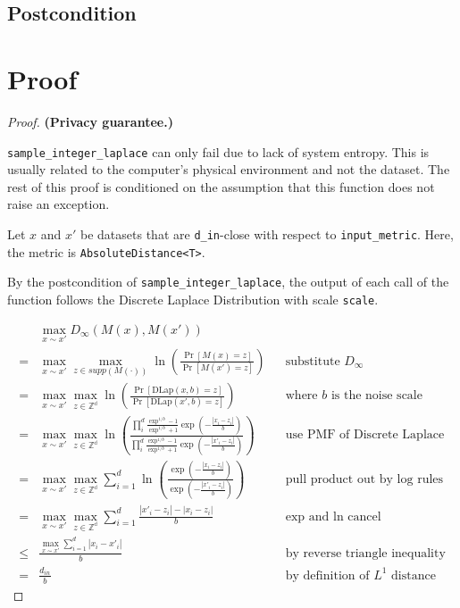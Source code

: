 \documentclass{article}
\begin{document}
\subsection*{Postcondition}


\section{Proof}

\begin{proof} 
\textbf{(Privacy guarantee.)} 

\texttt{sample\_integer\_laplace} can only fail due to lack of system entropy. 
This is usually related to the computer's physical environment and not the dataset. 
The rest of this proof is conditioned on the assumption that this function does not raise an exception. 

Let $x$ and $x'$ be datasets that are \texttt{d\_in}-close with respect to \texttt{input\_metric}.
Here, the metric is \texttt{AbsoluteDistance<T>}.

By the postcondition of \texttt{sample\_integer\_laplace},
the output of each call of the function follows the Discrete Laplace Distribution with scale \texttt{scale}.

\begin{align*}
    & \max_{x \sim x'} D_{\infty}(M(x), M(x'))  \\
    =& \max_{x \sim x'} \max_{z \in supp(M(\cdot))} \ln\left(\frac{\Pr\left[M(x) = z\right]}{\Pr\left[M(x') = z \right]}\right)
        &&\text{substitute } D_{\infty}\\
    =& \max_{x \sim x'} \max_{z \in \mathbb{Z^d}} \ln\left(\frac{\Pr\left[\mathrm{DLap}(x, b) = z \right]}{\Pr\left[\mathrm{DLap}(x', b) = z\right]}\right)
        &&\text{where } b \text{ is the noise scale} \\
    =& \max_{x \sim x'} \max_{z \in \mathbb{Z^d}} \ln\left(\frac{
        \prod_i^d \frac{\exp^{1/b} - 1}{\exp^{1/b} + 1} \exp \left( -\frac{|x_i - z_i|}{b} \right)
    }{
        \prod_i^d \frac{\exp^{1/b} - 1}{\exp^{1/b} + 1} \exp \left( -\frac{|x'_i - z_i|}{b} \right)
    }\right) 
        &&\text{use PMF of Discrete Laplace} \\
    =& \max_{x \sim x'} \max_{z \in \mathbb{Z^d}} \sum_{i=1}^d \ln\left(\frac{
    \exp \left( -\frac{|x_i - z_i|}{b} \right)
    }{
        \exp \left( -\frac{|x'_i - z_i|}{b} \right)
    }\right) &&\text{pull product out by log rules}\\
    =& \max_{x \sim x'} \max_{z \in \mathbb{Z^d}} \sum_{i=1}^d \frac{|x'_i - z_i| - |x_i - z_i|}{b}&& \text{exp and ln cancel} \\
    \leq& \frac{\max_{x \sim x'} \sum_{i=1}^d |x_i - x'_i|}{b} &&\text{by reverse triangle inequality} \\
    =& \frac{d_{in}}{b}  &&\text{by definition of } L^1 \text{ distance}
\end{align*}


\end{proof}
\end{document}
